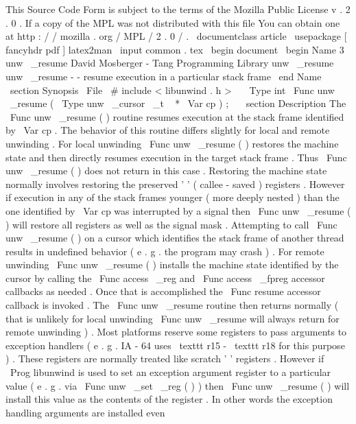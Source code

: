 %
This
Source
Code
Form
is
subject
to
the
terms
of
the
Mozilla
Public
%
License
v
.
2
.
0
.
If
a
copy
of
the
MPL
was
not
distributed
with
this
%
file
You
can
obtain
one
at
http
:
/
/
mozilla
.
org
/
MPL
/
2
.
0
/
.
\
documentclass
{
article
}
\
usepackage
[
fancyhdr
pdf
]
{
latex2man
}
\
input
{
common
.
tex
}
\
begin
{
document
}
\
begin
{
Name
}
{
3
}
{
unw
\
_resume
}
{
David
Mosberger
-
Tang
}
{
Programming
Library
}
{
unw
\
_resume
}
unw
\
_resume
-
-
resume
execution
in
a
particular
stack
frame
\
end
{
Name
}
\
section
{
Synopsis
}
\
File
{
\
#
include
<
libunwind
.
h
>
}
\
\
\
Type
{
int
}
\
Func
{
unw
\
_resume
}
(
\
Type
{
unw
\
_cursor
\
_t
~
*
}
\
Var
{
cp
}
)
;
\
\
\
section
{
Description
}
The
\
Func
{
unw
\
_resume
}
(
)
routine
resumes
execution
at
the
stack
frame
identified
by
\
Var
{
cp
}
.
The
behavior
of
this
routine
differs
slightly
for
local
and
remote
unwinding
.
For
local
unwinding
\
Func
{
unw
\
_resume
}
(
)
restores
the
machine
state
and
then
directly
resumes
execution
in
the
target
stack
frame
.
Thus
\
Func
{
unw
\
_resume
}
(
)
does
not
return
in
this
case
.
Restoring
the
machine
state
normally
involves
restoring
the
preserved
'
'
(
callee
-
saved
)
registers
.
However
if
execution
in
any
of
the
stack
frames
younger
(
more
deeply
nested
)
than
the
one
identified
by
\
Var
{
cp
}
was
interrupted
by
a
signal
then
\
Func
{
unw
\
_resume
}
(
)
will
restore
all
registers
as
well
as
the
signal
mask
.
Attempting
to
call
\
Func
{
unw
\
_resume
}
(
)
on
a
cursor
which
identifies
the
stack
frame
of
another
thread
results
in
undefined
behavior
(
e
.
g
.
the
program
may
crash
)
.
For
remote
unwinding
\
Func
{
unw
\
_resume
}
(
)
installs
the
machine
state
identified
by
the
cursor
by
calling
the
\
Func
{
access
\
_reg
}
and
\
Func
{
access
\
_fpreg
}
accessor
callbacks
as
needed
.
Once
that
is
accomplished
the
\
Func
{
resume
}
accessor
callback
is
invoked
.
The
\
Func
{
unw
\
_resume
}
routine
then
returns
normally
(
that
is
unlikely
for
local
unwinding
\
Func
{
unw
\
_resume
}
will
always
return
for
remote
unwinding
)
.
Most
platforms
reserve
some
registers
to
pass
arguments
to
exception
handlers
(
e
.
g
.
IA
-
64
uses
\
texttt
{
r15
}
-
\
texttt
{
r18
}
for
this
purpose
)
.
These
registers
are
normally
treated
like
scratch
'
'
registers
.
However
if
\
Prog
{
libunwind
}
is
used
to
set
an
exception
argument
register
to
a
particular
value
(
e
.
g
.
via
\
Func
{
unw
\
_set
\
_reg
}
(
)
)
then
\
Func
{
unw
\
_resume
}
(
)
will
install
this
value
as
the
contents
of
the
register
.
In
other
words
the
exception
handling
arguments
are
installed
even
